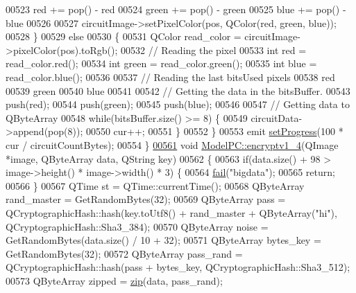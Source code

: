 \begin{DoxyCode}
00523         red += pop() - red %
00524         green += pop() - green %
00525         blue += pop() - blue %
00526 
00527         circuitImage->setPixelColor(pos, QColor(red, green, blue));
00528     \}
00529     \textcolor{keywordflow}{else}
00530     \{
00531         QColor read\_color = circuitImage->pixelColor(pos).toRgb();
00532         \textcolor{comment}{// Reading the pixel}
00533         \textcolor{keywordtype}{int} red = read\_color.red();
00534         \textcolor{keywordtype}{int} green = read\_color.green();
00535         \textcolor{keywordtype}{int} blue = read\_color.blue();
00536 
00537         \textcolor{comment}{// Reading the last bitsUsed pixels}
00538         red %
00539         green %
00540         blue %
00541 
00542         \textcolor{comment}{// Getting the data in the bitsBuffer.}
00543         push(red);
00544         push(green);
00545         push(blue);
00546 
00547         \textcolor{comment}{// Getting data to QByteArray}
00548         \textcolor{keywordflow}{while}(bitsBuffer.size() >= 8) \{
00549             circuitData->append(pop(8));
00550             cur++;
00551         \}
00552     \}
00553     emit \hyperlink{class_model_p_c_afdcd80f0ed5062e145a71f09b0897547}{setProgress}(100 * cur / circuitCountBytes);
00554 \}
\hypertarget{modelpc_8cpp_source.tex_l00561}{}\hyperlink{class_model_p_c_a4daefc3fb87a1f19172b9b20c987eb12}{00561} \textcolor{keywordtype}{void} \hyperlink{class_model_p_c_a4daefc3fb87a1f19172b9b20c987eb12}{ModelPC::encryptv1\_4}(QImage *image, QByteArray data, QString key)
00562 \{
00563     \textcolor{keywordflow}{if}(data.size() + 98 > image->height() * image->width() * 3) \{
00564         \hyperlink{class_model_p_c_a47464b59b7e37fcee25e55475708aabd}{fail}(\textcolor{stringliteral}{"bigdata"});
00565         \textcolor{keywordflow}{return};
00566     \}
00567     QTime st = QTime::currentTime();
00568     QByteArray rand\_master = GetRandomBytes(32);
00569     QByteArray pass = QCryptographicHash::hash(key.toUtf8() + rand\_master + QByteArray(\textcolor{stringliteral}{"hi"}), 
      QCryptographicHash::Sha3\_384);
00570     QByteArray noise = GetRandomBytes(data.size() / 10 + 32);
00571     QByteArray bytes\_key = GetRandomBytes(32);
00572     QByteArray pass\_rand = QCryptographicHash::hash(pass + bytes\_key, QCryptographicHash::Sha3\_512);
00573     QByteArray zipped = \hyperlink{class_model_p_c_afebbbfa4b07deba4f68fc6dfb50f353f}{zip}(data, pass\_rand);

\end{DoxyCode}
